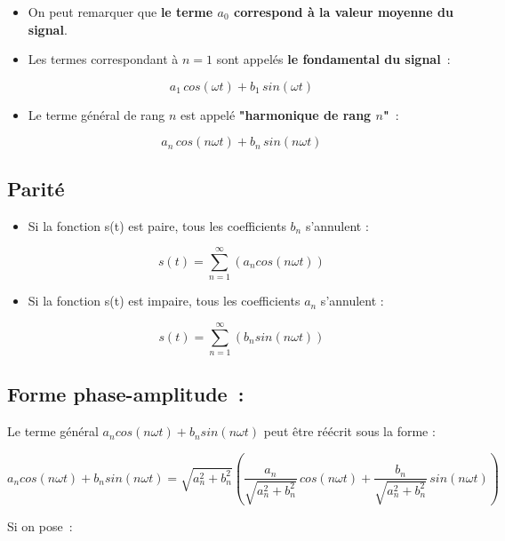 \begin{itemize}
\item On peut remarquer que \textbf{le terme $a_0$ correspond à la valeur moyenne du signal}. \\

\item Les termes correspondant à $n=1$ sont appelés \textbf{le fondamental du signal}~:

$$ a_1\,cos\left( \omega t \right) + b_1\,sin\left( \omega t\right) $$  

\item Le terme général de rang $n$ est appelé \textbf{"harmonique de rang $n$"}~:

$$ a_n\,cos\left( n\omega t \right) + b_n\,sin\left( n\omega t\right) $$

\end{itemize}

\subsection*{Parité}

\begin{itemize}
\item Si la fonction s(t) est paire, tous les coefficients $b_n$ s'annulent :

$$ s(t) = \sum_{n=1}^{\infty} \left(a_ncos\left( n\omega t\right) \right) $$

\item Si la fonction s(t) est impaire, tous les coefficients $a_n$ s'annulent :

$$ s(t) = \sum_{n=1}^{\infty} \left(b_nsin\left(n \omega t\right) \right) $$

\end{itemize}

\subsection*{Forme phase-amplitude~:}

Le terme général $a_n cos( n \omega t ) + b_n sin( n \omega t )$ peut être réécrit sous la forme : 

$$ a_ncos(n\omega t)+b_nsin(n\omega t) = \sqrt{a_n^2+b_n^2}\left(\dfrac{a_n}{\sqrt{a_n^2+b_n^2}}\,cos(n\omega t) + \dfrac{b_n}{\sqrt{a_n^2+b_n^2}}\,sin(n\omega t)\right)$$

Si on pose~:


